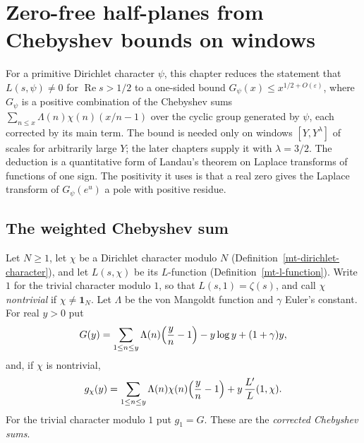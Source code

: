 \chapter{Zero-free half-planes from Chebyshev bounds on windows}\label{chapter-windowed-landau}

For a primitive Dirichlet character $\psi$, this chapter reduces the
statement that $L(s,\psi)\neq0$ for $\operatorname{Re}s>1/2$ to a one-sided
bound $G_\psi(x)\leq x^{1/2+O(\varepsilon)}$, where $G_\psi$ is a positive
combination of the Chebyshev sums $\sum_{n\leq x}\Lambda(n)\chi(n)(x/n-1)$
over the cyclic group generated by $\psi$, each corrected by its main term.
The bound is needed only on windows $[Y,Y^{\lambda}]$ of scales for
arbitrarily large $Y$; the later chapters supply it with $\lambda=3/2$. The
deduction is a quantitative form of Landau's theorem on Laplace transforms
of functions of one sign. The positivity it uses is that a real zero gives
the Laplace transform of $G_\psi(e^u)$ a pole with positive residue.

\section{The weighted Chebyshev sum}\label{section-wl-weighted-sum}

\begin{definition}\label{wl-corrected-sums}
Let $N\geq1$, let $\chi$ be a Dirichlet character modulo $N$
(Definition~\ref{mt-dirichlet-character}), and let $L(s,\chi)$ be its
$L$-function (Definition~\ref{mt-l-function}). Write $1$ for the trivial
character modulo $1$, so that $L(s,1)=\zeta(s)$, and call $\chi$
\emph{nontrivial} if $\chi\neq\mathbf 1_N$. Let $\Lambda$ be the von Mangoldt
function and $\gamma$ Euler's constant. For real $y>0$ put
\[
 G(y)=\sum_{1\leq n\leq y}\Lambda(n)\Bigl(\frac yn-1\Bigr)-y\log y+(1+\gamma)y,
\]
and, if $\chi$ is nontrivial,
\[
 g_\chi(y)=\sum_{1\leq n\leq y}\Lambda(n)\chi(n)\Bigl(\frac yn-1\Bigr)
 +y\,\frac{L'}{L}(1,\chi).
\]
For the trivial character modulo $1$ put $g_1=G$. These are the
\emph{corrected Chebyshev sums}.
\end{definition}


